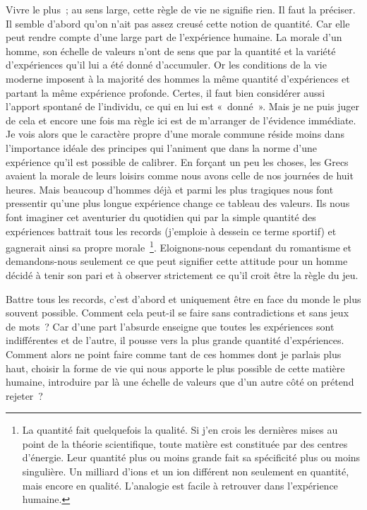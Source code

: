 \documentclass{book}
\begin{document}
Vivre le plus ; au sens large, cette règle de vie ne signifie rien. Il faut la préciser. Il semble d'abord qu'on n'ait pas assez creusé cette notion de quantité. Car elle peut rendre compte d'une large part de l'expérience humaine. La morale d'un homme, son échelle de valeurs n'ont de sens que par la quantité et la variété d'expériences qu'il lui a été donné d'accumuler. Or les conditions de la vie moderne imposent à la majorité des hommes la même quantité d'expériences et partant la même expérience profonde. Certes, il faut bien considérer aussi l'apport spontané de l'individu, ce qui en lui est « donné ». Mais je ne puis juger de cela et encore une fois ma règle ici est de m'arranger de l'évidence immédiate. Je vois alors que le caractère propre d'une morale commune réside moins dans l'importance idéale des principes qui l'animent que dans la norme d'une expérience qu'il est possible de calibrer. En forçant un peu les choses, les Grecs avaient la morale de leurs loisirs comme nous avons celle de nos journées de huit heures. Mais beaucoup d'hommes déjà et parmi les plus tragiques nous font pressentir qu'une plus longue expérience change ce tableau des valeurs. Ils nous font imaginer cet aventurier du quotidien qui par la simple quantité des expériences battrait tous les records (j'emploie à dessein ce terme sportif) et gagnerait ainsi sa propre morale \footnote{La quantité fait quelquefois la qualité. Si j’en crois les dernières mises au point de la théorie scientifique, toute matière est constituée par des centres d’énergie. Leur quantité plus ou moins grande fait sa spécificité plus ou moins singulière. Un milliard d’ions et un ion différent non seulement en quantité, mais encore en qualité. L’analogie est facile à retrouver dans l’expérience humaine.}. Eloignons-nous cependant du romantisme et demandons-nous seulement ce que peut signifier cette attitude pour un homme décidé à tenir son pari et à observer strictement ce qu'il croit être la règle du jeu.

Battre tous les records, c'est d'abord et uniquement être en face du monde le plus souvent possible. Comment cela peut-il se faire sans contradictions et sans jeux de mots ? Car d'une part l'absurde enseigne que toutes les expériences sont indifférentes et de l'autre, il pousse vers la plus grande quantité d'expériences. Comment alors ne point faire comme tant de ces hommes dont je parlais plus haut, choisir la forme de vie qui nous apporte le plus possible de cette matière humaine, introduire par là une échelle de valeurs que d'un autre côté on prétend rejeter ?
\end{document}
